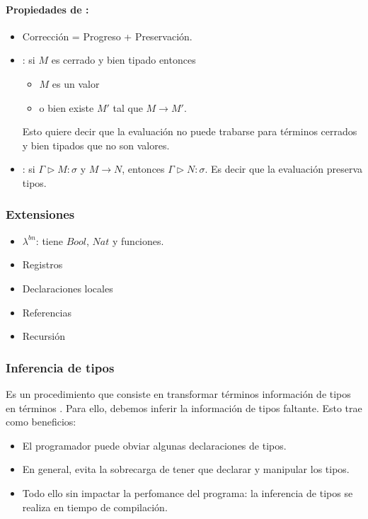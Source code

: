 \paragraph{Propiedades de :}

\begin{itemize}
  \item Corrección = Progreso + Preservación.
  \item {}: si $M$ es cerrado y bien tipado entonces
    \begin{itemize}
      \item $M$ es un valor
      \item o bien existe $M'$ tal que $M \to M'$.
    \end{itemize}
    Esto quiere decir que la evaluación no puede trabarse para términos cerrados y bien tipados que no son valores.
  \item {}: si $\Gamma \rhd M : \sigma$ y $M \to N$, entonces $\Gamma \rhd N : \sigma$. Es decir que la evaluación preserva tipos.
\end{itemize}

\subsubsection{Extensiones}

\begin{itemize}
  \item $\lambda^{bn}$: tiene $Bool$, $Nat$ y funciones.
  \item Registros
  \item Declaraciones locales
  \item Referencias
  \item Recursión
\end{itemize}

\subsubsection{Inferencia de tipos}

Es un procedimiento que consiste en transformar términos  información de tipos en términos . Para ello, debemos inferir la información de tipos faltante. Esto trae como beneficios:

\begin{itemize}
  \item El programador puede obviar algunas declaraciones de tipos.
  \item En general, evita la sobrecarga de tener que declarar y manipular  los tipos.
  \item Todo ello sin impactar la perfomance del programa: la inferencia de tipos se realiza en tiempo de compilación.
\end{itemize}

